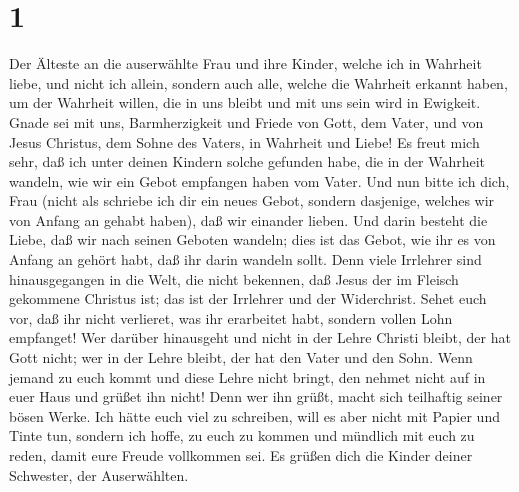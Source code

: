 \hypertarget{section}{%
\section{1}\label{section}}

 Der Älteste an die auserwählte Frau und ihre Kinder,
welche ich in Wahrheit liebe, und nicht ich allein, sondern auch alle,
welche die Wahrheit erkannt haben,  um der Wahrheit
willen, die in uns bleibt und mit uns sein wird in Ewigkeit.
 Gnade sei mit uns, Barmherzigkeit und Friede von Gott,
dem Vater, und von Jesus Christus, dem Sohne des Vaters, in Wahrheit und
Liebe!  Es freut mich sehr, daß ich unter deinen Kindern
solche gefunden habe, die in der Wahrheit wandeln, wie wir ein Gebot
empfangen haben vom Vater.  Und nun bitte ich dich, Frau
(nicht als schriebe ich dir ein neues Gebot, sondern dasjenige, welches
wir von Anfang an gehabt haben), daß wir einander lieben. 
Und darin besteht die Liebe, daß wir nach seinen Geboten wandeln; dies
ist das Gebot, wie ihr es von Anfang an gehört habt, daß ihr darin
wandeln sollt.  Denn viele Irrlehrer sind hinausgegangen
in die Welt, die nicht bekennen, daß Jesus der im Fleisch gekommene
Christus ist; das ist der Irrlehrer und der Widerchrist. 
Sehet euch vor, daß ihr nicht verlieret, was ihr erarbeitet habt,
sondern vollen Lohn empfanget!  Wer darüber hinausgeht und
nicht in der Lehre Christi bleibt, der hat Gott nicht; wer in der Lehre
bleibt, der hat den Vater und den Sohn.  Wenn jemand zu
euch kommt und diese Lehre nicht bringt, den nehmet nicht auf in euer
Haus und grüßet ihn nicht!  Denn wer ihn grüßt, macht
sich teilhaftig seiner bösen Werke.  Ich hätte euch viel
zu schreiben, will es aber nicht mit Papier und Tinte tun, sondern ich
hoffe, zu euch zu kommen und mündlich mit euch zu reden, damit eure
Freude vollkommen sei.  Es grüßen dich die Kinder deiner
Schwester, der Auserwählten.
